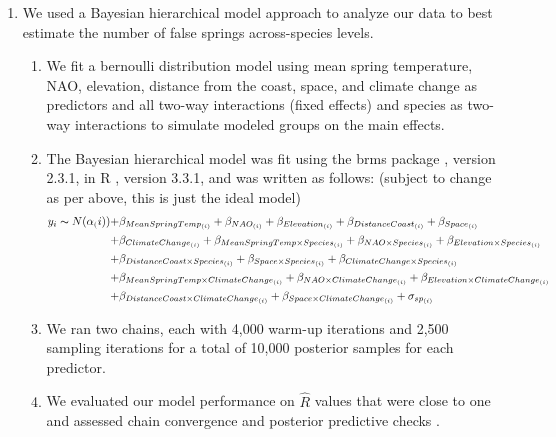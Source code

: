 \documentclass{article}\usepackage[]{graphicx}\usepackage[]{color}
\begin{document}
\begin{enumerate}
\item We used a Bayesian hierarchical model approach to analyze our data to best estimate the number of false springs across-species levels. 
\begin{enumerate}
\item We fit a bernoulli distribution model using mean spring temperature, NAO, elevation, distance from the coast, space, and climate change as predictors and all two-way interactions (fixed effects) and species as two-way interactions to simulate modeled groups on the main effects.
\item The Bayesian hierarchical model was fit using the brms package \citep{brms}, version 2.3.1,  in R \citep{R}, version 3.3.1, and was written as follows: (subject to change as per above, this is just the ideal model)
\begin{align*} \label{eq:1} %
y_i \thicksim N(\alpha_(i)) +& \beta_{MeanSpringTemp_{(i)}} + \beta_{NAO_{(i)}}+ \beta_{Elevation_{(i)}} + \beta_{DistanceCoast_{(i)}} + \beta_{Space_{(i)}} \\ +& \beta_{ClimateChange_{(i)}}
+ \beta_{MeanSpringTemp \times Species_{(i)}} + \beta_{NAO \times Species_{(i)}}+ \beta_{Elevation \times Species_{(i)}} \\ +& \beta_{DistanceCoast \times Species_{(i)}} + \beta_{Space \times Species_{(i)}} + \beta_{ClimateChange \times Species_{(i)}} \\
+& \beta_{MeanSpringTemp \times ClimateChange_{(i)}} + \beta_{NAO \times ClimateChange_{(i)}}
+ \beta_{Elevation \times ClimateChange_{(i)}} \\ +& \beta_{DistanceCoast \times ClimateChange_{(i)}} + \beta_{Space \times ClimateChange_{(i)}} + \sigma_{sp_{(i)}} 
\end{align*}
\item We ran two chains, each with 4,000 warm-up iterations and 2,500 sampling iterations for a total of 10,000 posterior samples for each predictor. 
\item We evaluated our model performance on $\hat{R}$ values that were close to one and assessed chain convergence and posterior predictive checks \citep{Gelman2006}.
\end{enumerate}
\end{enumerate}
\end{document}
